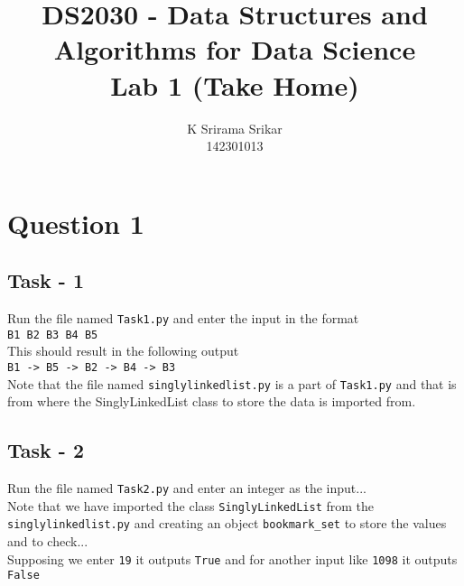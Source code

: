 \documentclass{article}
\title{\textbf{DS2030 - Data Structures and Algorithms for Data Science \\Lab 1 (Take Home)}}
\author{K Srirama Srikar \\142301013 }
\date{}
\begin{document}
\maketitle
\section{Question 1}
\subsection{Task - 1}
Run the file named \texttt{Task1.py} and enter the input in the format \\ \texttt{B1 B2 B3 B4 B5} \\
This should result in the following output \\\texttt{B1 -> B5 -> B2 -> B4 -> B3}\\
Note that the file named \texttt{singlylinkedlist.py} is a part of \texttt{Task1.py} and that is from where the SinglyLinkedList class to store the data is imported from.
\subsection{Task - 2}
Run the file named \texttt{Task2.py} and enter an integer as the input...\\Note that we have imported the class \texttt{SinglyLinkedList} from the \texttt{singlylinkedlist.py} and creating an object \texttt{bookmark\_set} to store the values and to check...\\ Supposing we enter \texttt{19} it outputs \texttt{True} and for another input like \texttt{1098} it outputs \texttt{False}
\end{document}
